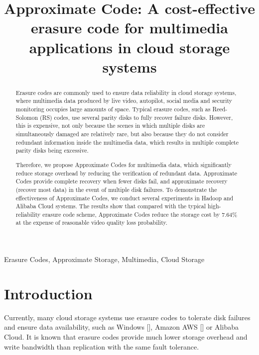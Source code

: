 \documentclass[conference]{IEEEtran}
\begin{document}
\title{\LARGE{Approximate Code: A cost-effective erasure code for multimedia applications in cloud storage systems}\\
}
\author{
}

\maketitle

\begin{abstract}
Erasure codes are commonly used to ensure data reliability in cloud storage systems, where multimedia data produced by live video, autopilot, social media and security monitoring occupies large amounts of space. 
Typical erasure codes, such as Reed-Solomon (RS) codes, use several parity disks to fully recover failure disks. 
However, this is expensive, not only because the scenes in which multiple disks are simultaneously damaged are relatively rare, but also because they do not consider redundant information inside the multimedia data, which results in multiple complete parity disks being excessive.	

Therefore, we propose Approximate Codes for multimedia data, which significantly reduce storage overhead by reducing the verification of redundant data.
Approximate Codes provide complete recovery when fewer disks fail, and approximate recovery (recover most data) in the event of multiple disk failures.
To demonstrate the effectiveness of Approximate Codes, we conduct several experiments in Hadoop and Alibaba Cloud systems.
The results show that compared with the typical high-reliability erasure code scheme, Approximate Codes reduce the storage cost by 7.64\% at the expense of reasonable video quality loss probability.
\end{abstract}

\begin{IEEEkeywords}
    Erasure Codes, Approximate Storage, Multimedia, Cloud Storage
\end{IEEEkeywords}

\section{Introduction}
Currently, many cloud storage systems use erasure codes to tolerate disk failures and ensure data availability, such as Windows [], Amazon AWS [] or Alibaba Cloud. It is known that erasure codes provide much lower storage overhead and write bandwidth than replication with the same fault tolerance.
\end{document}
